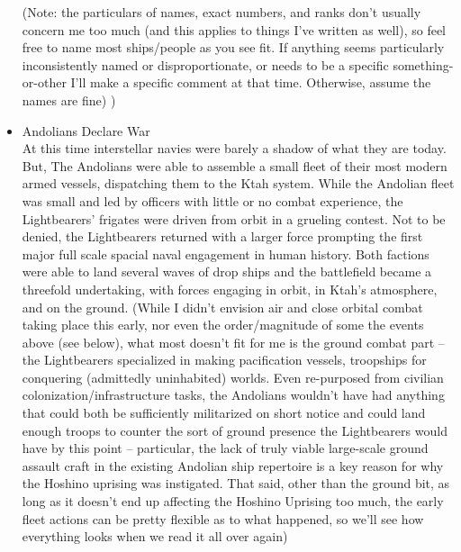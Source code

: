 \begin{itemize}
(Note: the particulars of names, exact numbers, and ranks don't
usually concern me too much (and this applies to things I've written
as well), so feel free to name most ships/people as you see fit. If
anything seems particularly inconsistently named or disproportionate,
or needs to be a specific something-or-other I'll make a specific
comment at that time. Otherwise, assume the names are fine) )

\item Andolians Declare War \\
	
At this time interstellar navies were barely a shadow of what they are
today.  But, The Andolians were able to assemble a small fleet of
their most modern armed vessels, dispatching them to the Ktah system.
While the Andolian fleet was small and led by officers with little or
no combat experience, the Lightbearers' frigates were driven from
orbit in a grueling contest.  Not to be denied, the Lightbearers
returned with a larger force prompting the first major full scale
spacial naval engagement in human history.  Both factions were able to
land several waves of drop ships and the battlefield became a
threefold undertaking, with forces engaging in orbit, in Ktah's
atmosphere, and on the ground. (While I didn't envision air and close
orbital combat taking place this early, nor even the order/magnitude
of some the events above (see below), what most doesn't fit for me is
the ground combat part -- the Lightbearers specialized
in making pacification vessels, troopships for conquering (admittedly
uninhabited) worlds. Even re-purposed from civilian
colonization/infrastructure tasks, the Andolians wouldn't have had
anything that could both be sufficiently militarized on short notice
and could land enough troops to counter the sort of ground presence
the Lightbearers would have by this point --
particular, the lack of truly viable large-scale ground assault craft
in the existing Andolian ship repertoire is a key reason for why the
Hoshino uprising was instigated. That said, other than the ground bit,
as long as it doesn't end up affecting the Hoshino Uprising too much,
the early fleet actions can be pretty flexible as to what happened, so
we'll see how everything looks when we read it all over again)


\end{itemize}
